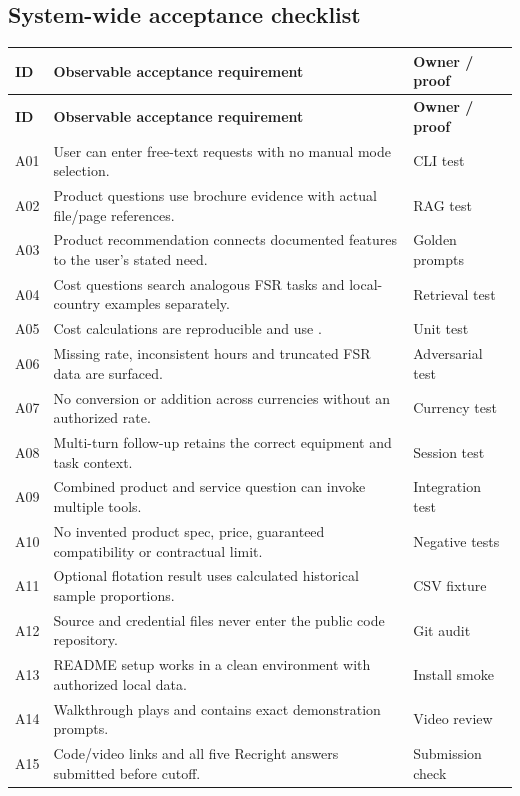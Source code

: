 \documentclass[11pt,a4paper]{article}
\DeclareRobustCommand{\code}[1]{{\ttfamily\small\detokenize{#1}}}
\begin{document}
\subsection{System-wide acceptance checklist}
\begin{longtable}{@{}L{13mm}L{111mm}L{24mm}@{}}
\toprule\textbf{ID} & \textbf{Observable acceptance requirement} & \textbf{Owner / proof}\\\midrule\endfirsthead
\toprule\textbf{ID} & \textbf{Observable acceptance requirement} & \textbf{Owner / proof}\\\midrule\endhead
A01 & User can enter free-text requests with no manual mode selection. & CLI test\\
A02 & Product questions use brochure evidence with actual file/page references. & RAG test\\
A03 & Product recommendation connects documented features to the user's stated need. & Golden prompts\\
A04 & Cost questions search analogous FSR tasks and local-country examples separately. & Retrieval test\\
A05 & Cost calculations are reproducible and use \code{Decimal}. & Unit test\\
A06 & Missing rate, inconsistent hours and truncated FSR data are surfaced. & Adversarial test\\
A07 & No conversion or addition across currencies without an authorized rate. & Currency test\\
A08 & Multi-turn follow-up retains the correct equipment and task context. & Session test\\
A09 & Combined product and service question can invoke multiple tools. & Integration test\\
A10 & No invented product spec, price, guaranteed compatibility or contractual limit. & Negative tests\\
A11 & Optional flotation result uses calculated historical sample proportions. & CSV fixture\\
A12 & Source and credential files never enter the public code repository. & Git audit\\
A13 & README setup works in a clean environment with authorized local data. & Install smoke\\
A14 & Walkthrough plays and contains exact demonstration prompts. & Video review\\
A15 & Code/video links and all five Recright answers submitted before cutoff. & Submission check\\
\bottomrule
\end{longtable}
\end{document}
